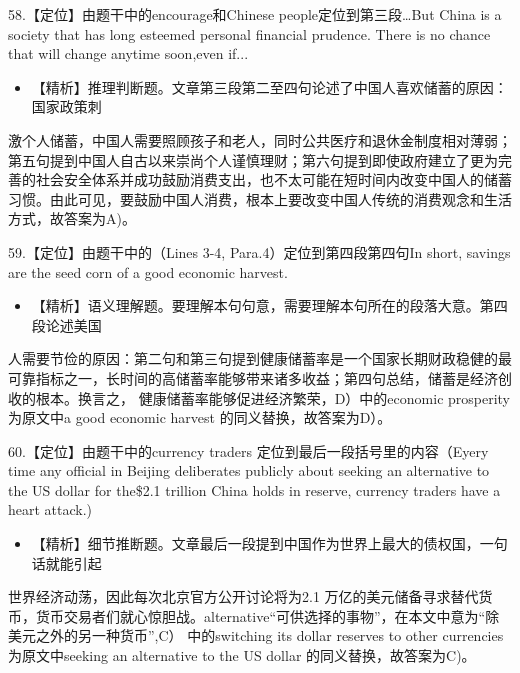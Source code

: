 \documentclass[UTF8,11pt]{ctexart}
\begin{document}
58.【定位】由题干中的encourage和Chinese people定位到第三段…But China is a society that has long esteemed personal financial prudence. There is no chance that will change anytime soon,even if...


\begin{itemize}[leftmargin=2em,itemsep=.2em,topsep=.4em]\item[A.] 【精析】推理判断题。文章第三段第二至四句论述了中国人喜欢储蓄的原因：国家政策刺
\end{itemize}

激个人储蓄，中国人需要照顾孩子和老人，同时公共医疗和退休金制度相对薄弱；第五句提到中国人自古以来崇尚个人谨慎理财；第六句提到即使政府建立了更为完善的社会安全体系并成功鼓励消费支出，也不太可能在短时间内改变中国人的储蓄习惯。由此可见，要鼓励中国人消费，根本上要改变中国人传统的消费观念和生活方式，故答案为A)。


59.【定位】由题干中的（Lines 3-4, Para.4）定位到第四段第四句In short, savings are the seed corn of a good economic harvest.


\begin{itemize}[leftmargin=2em,itemsep=.2em,topsep=.4em]\item[D.] 【精析】语义理解题。要理解本句句意，需要理解本句所在的段落大意。第四段论述美国
\end{itemize}

人需要节俭的原因：第二句和第三句提到健康储蓄率是一个国家长期财政稳健的最可靠指标之一，长时间的高储蓄率能够带来诸多收益；第四句总结，储蓄是经济创收的根本。换言之， 健康储蓄率能够促进经济繁荣，D）中的economic prosperity 为原文中a good economic harvest 的同义替换，故答案为D）。


60.【定位】由题干中的currency traders 定位到最后一段括号里的内容（Eyery time any official in Beijing deliberates publicly about seeking an alternative to the US dollar for the\$2.1 trillion China holds in reserve, currency traders have a heart attack.)


\begin{itemize}[leftmargin=2em,itemsep=.2em,topsep=.4em]\item[C.] 【精析】细节推断题。文章最后一段提到中国作为世界上最大的债权国，一句话就能引起
\end{itemize}

世界经济动荡，因此每次北京官方公开讨论将为2.1 万亿的美元储备寻求替代货币，货币交易者们就心惊胆战。alternative“可供选择的事物”，在本文中意为“除美元之外的另一种货币”,C） 中的switching its dollar reserves to other currencies 为原文中seeking an alternative to the US dollar 的同义替换，故答案为C)。
\end{document}
